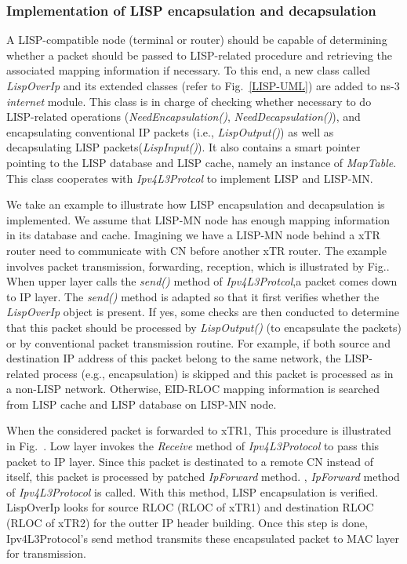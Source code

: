 \subsubsection{Implementation of LISP encapsulation and decapsulation}
A LISP-compatible node (terminal or router) should be capable of determining whether a packet should be passed to LISP-related procedure and retrieving the associated mapping information if necessary. To this end, a new class called \emph{LispOverIp} and its extended classes (refer to Fig.~\ref{LISP-UML}) are added to ns-3 \emph{internet} module. This class is in charge of checking whether necessary to do LISP-related operations (\emph{NeedEncapsulation()}, \emph{NeedDecapsulation()}), and encapsulating conventional IP packets (i.e., \emph{LispOutput()}) as well as decapsulating LISP packets(\emph{LispInput()}). It also contains a smart pointer pointing to the LISP database and LISP cache, namely an instance of \emph{MapTable}. This class cooperates with \emph{Ipv4L3Protcol} to implement LISP and LISP-MN.

We take an example to illustrate how LISP encapsulation and decapsulation is implemented. We assume that LISP-MN node has enough mapping information in its database and cache.
Imagining we have a LISP-MN node behind a xTR router need to communicate with CN before another xTR router. The example involves packet transmission, forwarding, reception, which is illustrated by Fig.. When upper layer calls the \emph{send()} method of \emph{Ipv4L3Protcol},a packet comes down to IP layer. The \emph{send()} method is adapted so that    
it first verifies whether the \emph{LispOverIp} object is present. If yes, some checks are then conducted to determine that this packet should be processed by \emph{LispOutput()} (to encapsulate the packets) or by conventional packet transmission routine. For example, if both source and destination IP address of this packet belong to the same network, the LISP-related process (e.g., encapsulation) is skipped and this packet is processed as in a non-LISP network. Otherwise, EID-RLOC mapping information is searched from LISP cache and LISP database on LISP-MN node. 



When the considered packet is forwarded to xTR1, This procedure is illustrated in Fig.~. Low layer invokes the \emph{Receive} method of \emph{Ipv4L3Protocol} to pass this packet to IP layer. Since this packet is destinated to a remote CN instead of itself, this packet is processed by patched \emph{IpForward} method. , \emph{IpForward} method of \emph{Ipv4L3Protocol} is called. With this method, LISP encapsulation is verified. LispOverIp looks for source RLOC (RLOC of xTR1) and destination RLOC (RLOC of xTR2) for the outter IP header building. Once this step is done, Ipv4L3Protocol's send method transmits these encapsulated packet to MAC layer for transmission.

